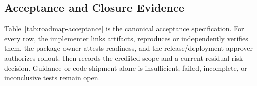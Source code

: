\documentclass[../main.tex]{subfiles}
\begin{document}
\subsection{Acceptance and Closure Evidence}

Table~\ref{tab:roadmap-acceptance} is the canonical acceptance specification.
For every row, the implementer links artifacts,  reproduces or
independently verifies them, the package owner attests readiness, and the
release/deployment approver authorizes rollout.  then records the
credited scope and a current residual-risk decision. Guidance or code shipment
alone is insufficient; failed, incomplete, or inconclusive tests remain open.

\begingroup
\normalsize
\setlength{\tabcolsep}{3pt}
\renewcommand{\arraystretch}{1.18}
\setlength{\LTleft}{-0.8in}
\setlength{\LTright}{-0.8in}
\end{document}
